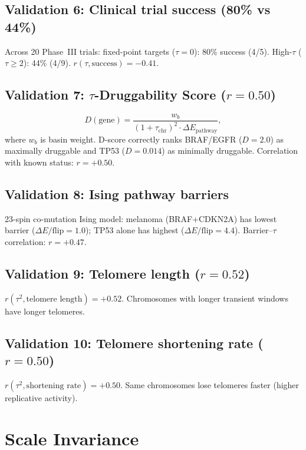 \documentclass[11pt,a4paper]{article}
\begin{document}
\subsection{Validation 6: Clinical trial success (80\% vs 44\%)}

Across 20 Phase~III trials: fixed-point targets ($\tau = 0$): 80\% success (4/5). High-$\tau$ ($\tau \geq 2$): 44\% (4/9). $r(\tau, \text{success}) = -0.41$.

\subsection{Validation 7: $\tau$-Druggability Score ($r = 0.50$)}

\begin{equation}
D(\text{gene}) = \frac{w_b}{(1 + \tau_{\text{chr}})^2 \cdot \Delta E_{\text{pathway}}},
\end{equation}
where $w_b$ is basin weight. D-score correctly ranks BRAF/EGFR ($D = 2.0$) as maximally druggable and TP53 ($D = 0.014$) as minimally druggable. Correlation with known status: $r = +0.50$.

\subsection{Validation 8: Ising pathway barriers}

23-spin co-mutation Ising model: melanoma (BRAF+CDKN2A) has lowest barrier ($\Delta E/\text{flip} = 1.0$); TP53 alone has highest ($\Delta E/\text{flip} = 4.4$). Barrier--$\tau$ correlation: $r = +0.47$.

\subsection{Validation 9: Telomere length ($r = 0.52$)}

$r(\tau^2, \text{telomere length}) = +0.52$. Chromosomes with longer transient windows have longer telomeres.

\subsection{Validation 10: Telomere shortening rate ($r = 0.50$)}

$r(\tau^2, \text{shortening rate}) = +0.50$. Same chromosomes lose telomeres faster (higher replicative activity).

\section{Scale Invariance}
\end{document}
